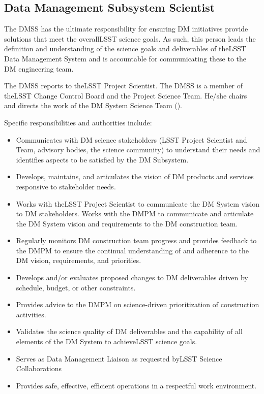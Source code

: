 \subsection{Data Management Subsystem Scientist} \label{role:dmps}

The \gls{DMSS} has the ultimate responsibility for ensuring DM initiatives provide solutions that meet the overallLSST science goals.
As such, this person leads the definition and understanding of the science goals and deliverables of theLSST Data Management System and is accountable for communicating these to the DM engineering team.

The \gls{DMSS} reports to theLSST \gls{Project Scientist}.
The \gls{DMSS} is a member of theLSST \gls{Change Control Board} and the \gls{Project Science Team}.
He/she chairs and directs the work of the DM System Science Team ().

Specific responsibilities and authorities include:

\begin{itemize}
\item Communicates with DM science stakeholders (LSST \gls{Project Scientist} and Team, advisory bodies, the science community) to understand their needs and identifies aspects to be satisfied by the DM Subsystem.
\item Develops, maintains, and articulates the vision of DM products and services responsive to stakeholder needs.
\item Works with theLSST \gls{Project Scientist} to communicate the DM System vision to DM stakeholders. Works with the \gls{DMPM} to communicate and articulate the DM System vision and requirements to the DM construction team.
\item Regularly monitors DM construction team progress and provides feedback to the \gls{DMPM} to ensure the continual understanding of and adherence to the DM vision, requirements, and priorities.
\item Develops and/or evaluates proposed changes to DM deliverables driven by schedule, budget, or other constraints.
\item Provides advice to the \gls{DMPM} on science-driven prioritization of construction activities.
\item Validates the science quality of DM deliverables and the capability of all elements of the DM System to achieveLSST science goals.
\item Serves as Data Management Liaison as requested byLSST Science Collaborations
\item Provides safe, effective, efficient operations in a respectful work environment.
\end{itemize}

